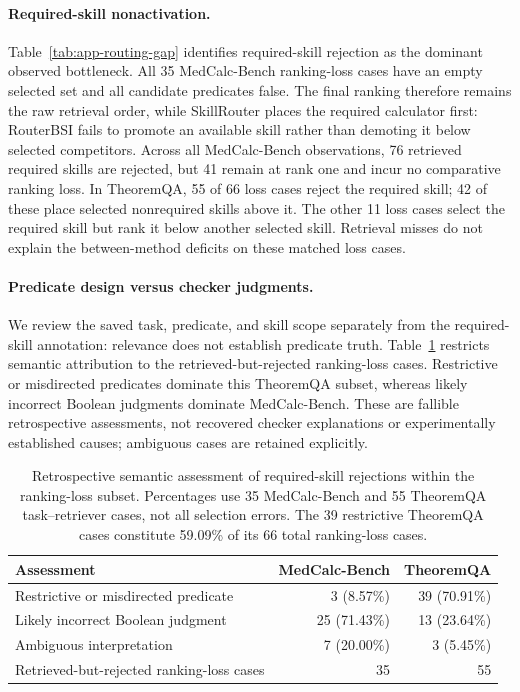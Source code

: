 \paragraph{Required-skill nonactivation.}
Table~\ref{tab:app-routing-gap} identifies required-skill rejection as the dominant observed bottleneck. All 35 MedCalc-Bench ranking-loss cases have an empty selected set and all candidate predicates false. The final ranking therefore remains the raw retrieval order, while SkillRouter places the required calculator first: RouterBSI fails to promote an available skill rather than demoting it below selected competitors. Across all MedCalc-Bench observations, 76 retrieved required skills are rejected, but 41 remain at rank one and incur no comparative ranking loss. In TheoremQA, 55 of 66 loss cases reject the required skill; 42 of these place selected nonrequired skills above it. The other 11 loss cases select the required skill but rank it below another selected skill. Retrieval misses do not explain the between-method deficits on these matched loss cases.

\paragraph{Predicate design versus checker judgments.}
We review the saved task, predicate, and skill scope separately from the required-skill annotation: relevance does not establish predicate truth. Table~\ref{tab:app-routing-gap-attribution} restricts semantic attribution to the retrieved-but-rejected ranking-loss cases. Restrictive or misdirected predicates dominate this TheoremQA subset, whereas likely incorrect Boolean judgments dominate MedCalc-Bench. These are fallible retrospective assessments, not recovered checker explanations or experimentally established causes; ambiguous cases are retained explicitly.

\begin{table}[t]
\centering
\small
\begin{tabular}{lrr}
\toprule
Assessment & MedCalc-Bench & TheoremQA \\
\midrule
Restrictive or misdirected predicate & 3 (8.57\%) & 39 (70.91\%) \\
Likely incorrect Boolean judgment & 25 (71.43\%) & 13 (23.64\%) \\
Ambiguous interpretation & 7 (20.00\%) & 3 (5.45\%) \\
\midrule
Retrieved-but-rejected ranking-loss cases & 35 & 55 \\
\bottomrule
\end{tabular}
\caption{Retrospective semantic assessment of required-skill rejections within the ranking-loss subset. Percentages use 35 MedCalc-Bench and 55 TheoremQA task--retriever cases, not all selection errors. The 39 restrictive TheoremQA cases constitute 59.09\% of its 66 total ranking-loss cases.}
\label{tab:app-routing-gap-attribution}
\end{table}

